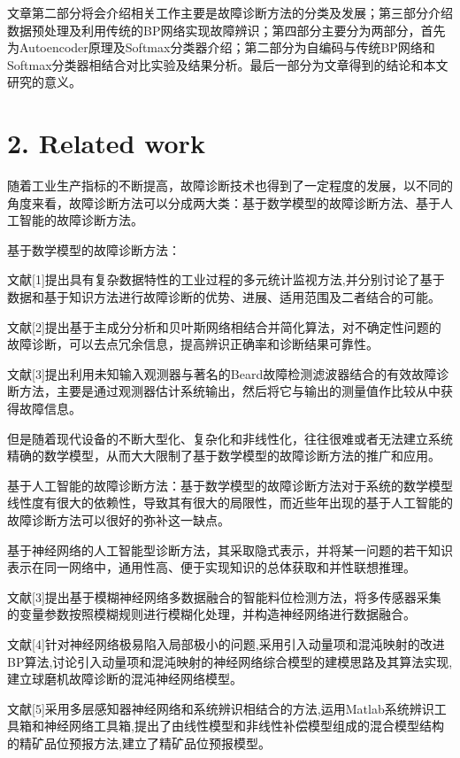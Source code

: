 文章第二部分将会介绍相关工作主要是故障诊断方法的分类及发展；第三部分介绍数据预处理及利用传统的BP网络实现故障辨识；第四部分主要分为两部分，首先为Autoencoder原理及Softmax分类器介绍；第二部分为自编码与传统BP网络和Softmax分类器相结合对比实验及结果分析。最后一部分为文章得到的结论和本文研究的意义。

\section{2. Related work}\label{related-work}

随着工业生产指标的不断提高，故障诊断技术也得到了一定程度的发展，以不同的角度来看，故障诊断方法可以分成两大类：基于数学模型的故障诊断方法、基于人工智能的故障诊断方法。

基于数学模型的故障诊断方法：

文献{[}1{]}提出具有复杂数据特性的工业过程的多元统计监视方法,并分别讨论了基于数据和基于知识方法进行故障诊断的优势、进展、适用范围及二者结合的可能。

文献{[}2{]}提出基于主成分分析和贝叶斯网络相结合并简化算法，对不确定性问题的故障诊断，可以去点冗余信息，提高辨识正确率和诊断结果可靠性。

文献{[}3{]}提出利用未知输入观测器与著名的Beard故障检测滤波器结合的有效故障诊断方法，主要是通过观测器估计系统输出，然后将它与输出的测量值作比较从中获得故障信息。

但是随着现代设备的不断大型化、复杂化和非线性化，往往很难或者无法建立系统精确的数学模型，从而大大限制了基于数学模型的故障诊断方法的推广和应用。

基于人工智能的故障诊断方法：基于数学模型的故障诊断方法对于系统的数学模型线性度有很大的依赖性，导致其有很大的局限性，而近些年出现的基于人工智能的故障诊断方法可以很好的弥补这一缺点。

基于神经网络的人工智能型诊断方法，其采取隐式表示，并将某一问题的若干知识表示在同一网络中，通用性高、便于实现知识的总体获取和并性联想推理。

文献{[}3{]}提出基于模糊神经网络多数据融合的智能料位检测方法，将多传感器采集的变量参数按照模糊规则进行模糊化处理，并构造神经网络进行数据融合。

文献{[}4{]}针对神经网络极易陷入局部极小的问题,采用引入动量项和混沌映射的改进BP算法,讨论引入动量项和混沌映射的神经网络综合模型的建模思路及其算法实现,建立球磨机故障诊断的混沌神经网络模型。

文献{[}5{]}采用多层感知器神经网络和系统辨识相结合的方法,运用Matlab系统辨识工具箱和神经网络工具箱,提出了由线性模型和非线性补偿模型组成的混合模型结构的精矿品位预报方法,建立了精矿品位预报模型。

